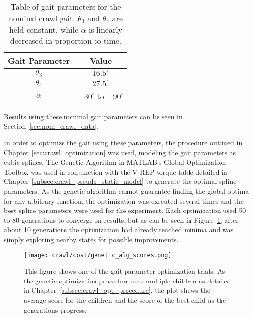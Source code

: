 \begin{table}
  \centering
  \begin{tabulary}{0.5\textwidth}{|c||c|}
    \hline
    \textbf{Gait Parameter} & \textbf{Value}                \\  \hline\hline
    $\theta_3$              &   $16.5^\circ$                \\ 
    $\theta_4$              &   $27.5^\circ$                \\  
    $\alpha$                &   $-30^\circ$ to $-90^\circ$  \\  \hline
  \end{tabulary} 
  
  \caption{Table of gait parameters for the nominal crawl gait. $\theta_3$ and $\theta_4$
           are held constant, while $\alpha$ is linearly decreased in proportion to time.}
  \label{tab:nominal_parameters}
\end{table}

Results using these nominal gait parameters can be seen in Section~\ref{sec:nom_crawl_data}.


In order to optimize the gait using these parameters, the procedure outlined in
Chapter~\ref{sec:crawl_optimization} was used, modeling the gait parameters as cubic splines.
The Genetic Algorithm in MATLAB's Global Optimization Toolbox was used in conjunction
with the V-REP torque table detailed in Chapter~\ref{subsec:crawl_pseudo_static_model}
to generate the optimal spline parameters. 
As the genetic algorithm cannot guarantee finding the global optima for any arbitrary function,
the optimization was executed several times and the best spline parameters were used
for the experiment. Each optimization used 50 to 80 generations to converge on results,
but as can be seen in Figure~\ref{fig:ga_generations}, after about 10 generations the
optimization had already reached minima and was simply exploring nearby states for possible
improvements.

\begin{figure}
  \centering
  \texttt{[image: crawl/cost/genetic\_alg\_scores.png]}
  \caption{This figure shows one of the gait parameter optimization trials.
           As the genetic optimization procedure uses multiple children as detailed in Chapter~\ref{subsec:crawl_opt_procedure}, the 
           plot shows the average score for the children and the score of the best
           child as the generations progress.}
  \label{fig:ga_generations}
\end{figure}

